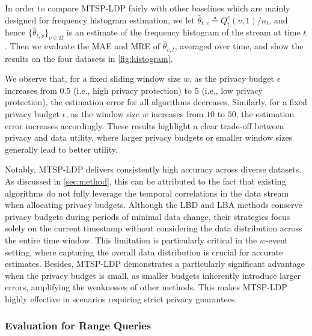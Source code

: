 \documentclass[acmsmall]{acmart}
\begin{document}


In order to compare MTSP-LDP fairly with other baselines which are mainly
designed for frequency histogram estimation, we let $\hat\theta_{t,v}\triangleq
Q_t^c(v,1)/n_t$, and hence $\{\hat\theta_{t,v}\}_{v\in\Omega}$ is an estimate of
the frequency histogram of the stream at time $t$.
Then we evaluate the MAE and MRE of $\hat\theta_{v,t}$, averaged over time, and show
the results on the four datasets in \cref{fig:histogram}.

We observe that, for a fixed sliding window size $w$, as the privacy budget
$\epsilon$ increases from $0.5$ (i.e., high privacy protection) to $5$ (i.e., low
privacy protection), the estimation error for all algorithms decreases.
Similarly, for a fixed privacy budget $\epsilon$, as the window size $w$
increases from $10$ to $50$, the estimation error increases accordingly.
These results highlight a clear trade-off between privacy and data utility,
where larger privacy budgets or smaller window sizes generally lead to better
utility.

Notably, MTSP-LDP delivers consistently high accuracy across diverse datasets.
As discussed in \cref{sec:method}, this can be attributed to the fact that
existing algorithms do not fully leverage the temporal correlations in the data
stream when allocating privacy budgets.
Although the LBD and LBA methods conserve privacy budgets during periods of
minimal data change, their strategies focus solely on the current timestamp
without considering the data distribution across the entire time window.
This limitation is particularly critical in the $w$-event setting, where
capturing the overall data distribution is crucial for accurate estimates.
Besides, MTSP-LDP demonstrates a particularly significant advantage when the
privacy budget is small, as smaller budgets inherently introduce larger errors,
amplifying the weaknesses of other methods.
This makes MTSP-LDP highly effective in scenarios requiring strict privacy
guarantees.


\subsubsection{Evaluation for Range Queries}
\end{document}
